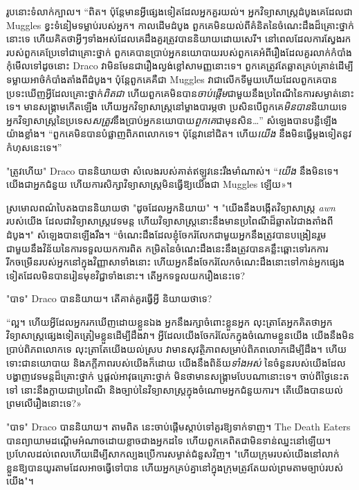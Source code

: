 {{{រូប​នោះ​ទំលាក់​ក្បាល។ “ពិត។ ប៉ុន្តែមានអ្វីផ្សេងទៀតដែលអ្នកគួរយល់។ អ្នកវិទ្យាសាស្ត្រដំបូងគេដែលជា Muggles ខ្វះទំនៀមទម្លាប់របស់អ្នក។ កាលដើមដំបូង ពួកគេមិនយល់ពីគំនិតនៃចំណេះដឹងដ៏គ្រោះថ្នាក់នោះទេ ហើយគិតថាអ្វីៗទាំងអស់ដែលគេដឹងគួរត្រូវបាននិយាយដោយសេរី។ នៅពេលដែលការស្វែងរករបស់ពួកគេប្រែទៅជាគ្រោះថ្នាក់ ពួកគេបានប្រាប់អ្នកនយោបាយរបស់ពួកគេអំពីរឿងដែលគួរលាក់កំបាំង កុំមើលទៅដូចនោះ Draco វាមិនមែនជារឿងល្ងង់ខ្លៅសាមញ្ញនោះទេ។ ពួកគេត្រូវតែឆ្លាតគ្រប់គ្រាន់ដើម្បីទម្លាយអាថ៌កំបាំងតាំងពីដំបូង។ ប៉ុន្តែពួកគេគឺជា Muggles វាជាលើកទីមួយហើយដែលពួកគេបានប្រទះឃើញអ្វីដែលគ្រោះថ្នាក់\emph{ពិតជា} ហើយពួកគេមិនបាន\emph{ចាប់ផ្តើម}ជាមួយនឹងប្រពៃណីនៃការសម្ងាត់នោះទេ។ មានសង្រ្គាមកើតឡើង ហើយអ្នកវិទ្យាសាស្ត្រនៅម្ខាងបារម្ភថា ប្រសិនបើពួកគេ\emph{មិនបាន}និយាយទេ អ្នកវិទ្យាសាស្ត្រនៃប្រទេស\emph{សត្រូវ}នឹងប្រាប់អ្នកនយោបាយ\emph{ពួកគេ}ជាមុនសិន…” សំឡេងបានបន្លឺឡើងយ៉ាងខ្លាំង។ “ពួកគេមិនបានបំផ្លាញពិភពលោកទេ។ ប៉ុន្តែវានៅជិត។ ហើយ\emph{យើង} នឹងមិនធ្វើម្តងទៀតនូវកំហុសនេះទេ។”

"ត្រូវហើយ" Draco បាននិយាយថា សំលេងរបស់គាត់ឥឡូវនេះរឹងមាំណាស់។ “\emph{យើង} នឹងមិនទេ។ យើង​ជា​អ្នក​ជំនួយ ហើយ​ការ​សិក្សា​វិទ្យាសាស្ត្រ​មិន​ធ្វើ​ឱ្យ​យើង​ជា Muggles ឡើយ»។

ស្រមោលពណ៌បៃតងបាននិយាយថា "ដូចដែលអ្នកនិយាយ" ។ "យើងនឹងបង្កើតវិទ្យាសាស្ត្រ \emph{awn} របស់យើង ដែលជាវិទ្យាសាស្ត្រវេទមន្ត ហើយវិទ្យាសាស្រ្តនោះនឹងមានប្រពៃណីដ៏ឆ្លាតវៃជាងតាំងពីដំបូង។" សំឡេងបានឡើងរឹង។ “ចំណេះដឹងដែលខ្ញុំចែករំលែកជាមួយអ្នកនឹងត្រូវបានបង្រៀនរួមជាមួយនឹងវិន័យនៃការទទួលយកការពិត កម្រិតនៃចំណេះដឹងនេះនឹងត្រូវបានគន្លឹះឆ្ពោះទៅរកការរីកចម្រើនរបស់អ្នកនៅក្នុងវិញ្ញាសាទាំងនោះ ហើយអ្នកនឹងចែករំលែកចំណេះដឹងនោះទៅកាន់អ្នកផ្សេងទៀតដែលមិនបានរៀនមុខវិជ្ជាទាំងនោះ។ តើអ្នកទទួលយករឿងនេះទេ?

"បាទ" Draco បាននិយាយ។ តើគាត់គួរធ្វើអ្វី និយាយថាទេ?

“ល្អ។ ហើយអ្វីដែលអ្នករកឃើញដោយខ្លួនឯង អ្នកនឹងរក្សាចំពោះខ្លួនអ្នក លុះត្រាតែអ្នកគិតថាអ្នកវិទ្យាសាស្ត្រផ្សេងទៀតត្រៀមខ្លួនដើម្បីដឹងវា។ អ្វី​ដែល​យើង​ចែក​រំលែក​ក្នុង​ចំណោម​ខ្លួន​យើង យើង​នឹង​មិន​ប្រាប់​ពិភព​លោក​ទេ លុះ​ត្រា​តែ​យើង​យល់​ស្រប វា​មាន​សុវត្ថិភាព​សម្រាប់​ពិភពលោក​ដើម្បី​ដឹង។ ហើយទោះជានយោបាយ និងភក្ដីភាពរបស់យើងក៏ដោយ យើងនឹងពិន័យ\emph{ទាំងអស់} នៃចំនួនរបស់យើងដែលបង្ហាញវេទមន្តដ៏គ្រោះថ្នាក់ ឬផ្តល់អាវុធគ្រោះថ្នាក់ មិនថាមានសង្រ្គាមបែបណានោះទេ។ ចាប់ពីថ្ងៃនេះតទៅ នោះនឹងក្លាយជាប្រពៃណី និងច្បាប់នៃវិទ្យាសាស្ត្រក្នុងចំណោមអ្នកជំនួយការ។ តើ​យើង​បាន​យល់​ព្រម​លើ​រឿង​នោះ​ទេ?»

"បាទ" Draco បាននិយាយ។ តាមពិត \emph{} នេះចាប់ផ្តើមស្តាប់ទៅគួរឱ្យទាក់ទាញ។ The Death Eaters បានព្យាយាមដណ្តើមអំណាចដោយខ្លាចជាងអ្នកដទៃ ហើយពួកគេពិតជាមិនទាន់ឈ្នះនៅឡើយ។ ប្រហែល​ដល់​ពេល​ហើយ​ដើម្បី​សាកល្បង​ប្រើ​ការ​សម្ងាត់​ជំនួស​វិញ។ "ហើយក្រុមរបស់យើងនៅលាក់ខ្លួនឱ្យបានយូរតាមដែលអាចធ្វើទៅបាន ហើយអ្នកគ្រប់គ្នានៅក្នុងក្រុមត្រូវតែយល់ព្រមតាមច្បាប់របស់យើង"។

}}}
